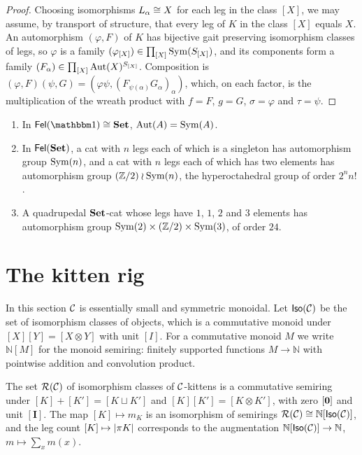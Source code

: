 \begin{proof}
Choosing isomorphisms $L_\alpha\cong X$ for each leg in the class $[X]$, we may
assume, by transport of structure, that every leg of $K$ in the class $[X]$
equals $X$. An automorphism $(\varphi,F)$ of $K$ has bijective gait preserving
isomorphism classes of legs, so $\varphi$ is a family
$(\varphi_{[X]})\in\prod_{[X]}\mathrm{Sym}(S_{[X]})$, and its components form a family
$(F_\alpha)\in\prod_{[X]}\mathrm{Aut}(X)^{S_{[X]}}$. Composition is
$(\varphi,F)(\psi,G)=(\varphi\psi,(F_{\psi(\alpha)}G_\alpha)_\alpha)$, which, on each
factor, is the multiplication of the wreath product with $f=F$, $g=G$,
$\sigma=\varphi$ and $\tau=\psi$.
\end{proof}

\begin{example}\label{ex:automorphisms}
\begin{enumerate}
\item In $\Fel(\one)\iso\Set$, $\mathrm{Aut}(A)=\mathrm{Sym}(A)$.
\item In $\mathsf{Fel}(\mathbf{Set})$, a cat with $n$ legs each of which is a singleton has
  automorphism group $\mathrm{Sym}(n)$, and a cat with $n$ legs each of which has two
  elements has automorphism group $(\mathbb Z/2)\wr\mathrm{Sym}(n)$, the hyperoctahedral
  group of order $2^nn!$.
\item A quadrupedal $\mathbf{Set}$-cat whose legs have $1$, $1$, $2$ and $3$ elements has
  automorphism group $\mathrm{Sym}(2)\times(\mathbb Z/2)\times\mathrm{Sym}(3)$, of order $24$.
\end{enumerate}
\end{example}

\section{The kitten rig}\label{sec:kitten-rig}

In this section $\mathcal{C}$ is essentially small and symmetric monoidal. Let
$\mathsf{Iso}(\mathcal{C})$ be the set of isomorphism classes of objects, which is a commutative
monoid under $[X][Y]=[X\otimes Y]$ with unit $[I]$. For a commutative monoid
$M$ we write $\mathbb N[M]$ for the monoid semiring: finitely supported functions
$M\to\mathbb N$ with pointwise addition and convolution product.

\begin{theorem}\label{thm:kitten-rig}
The set $\mathcal R(\mathcal{C})$ of isomorphism classes of $\mathcal{C}$-kittens is a
commutative semiring under $[K]+[K']=[K\sqcup K']$ and $[K][K']=[K\otimes K']$,
with zero $[\mathbf{0}]$ and unit $[\mathbf I]$. The map $[K]\mapsto m_K$ is an
isomorphism of semirings $\mathcal R(\mathcal{C})\cong\mathbb N[\mathsf{Iso}(\mathcal{C})]$, and the leg
count $[K]\mapsto|\pi K|$ corresponds to the augmentation
$\mathbb N[\mathsf{Iso}(\mathcal{C})]\to\mathbb N$, $m\mapsto\sum_xm(x)$.
\end{theorem}

